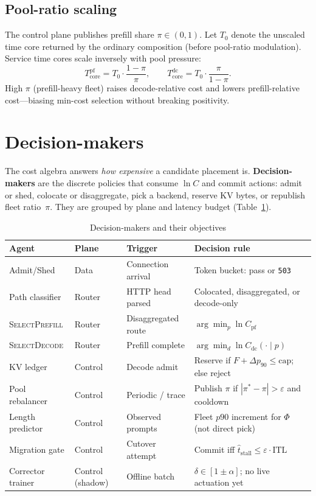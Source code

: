 \documentclass[11pt,a4paper]{article}
\begin{document}
\subsection{Pool-ratio scaling}

The control plane publishes prefill share $\pi \in (0,1)$.
Let $T_0$ denote the unscaled time core returned by the ordinary composition
(before pool-ratio modulation).
Service time cores scale inversely with pool pressure:
\begin{equation}
  T_{\mathrm{core}}^{\mathrm{pf}} = T_0 \cdot \frac{1-\pi}{\pi},
  \qquad
  T_{\mathrm{core}}^{\mathrm{dc}} = T_0 \cdot \frac{\pi}{1-\pi}.
\end{equation}
High $\pi$ (prefill-heavy fleet) raises decode-relative cost and lowers
prefill-relative cost---biasing min-cost selection without breaking
positivity.

\section{Decision-makers}

The cost algebra answers \emph{how expensive} a candidate placement is.
\textbf{Decision-makers} are the discrete policies that consume $\ln C$ and
commit actions: admit or shed, colocate or disaggregate, pick a backend,
reserve KV bytes, or republish fleet ratio~$\pi$.
They are grouped by plane and latency budget (Table~\ref{tab:deciders}).

\begin{table}[t]
  \centering
  \caption{Decision-makers and their objectives}
  \label{tab:deciders}
  \small
  \begin{tabular}{@{}p{2.1cm}p{2.4cm}p{2.6cm}p{4.8cm}@{}}
    \toprule
    Agent & Plane & Trigger & Decision rule \\
    \midrule
    Admit/Shed & Data & Connection arrival & Token bucket: pass or \texttt{503} \\
    Path classifier & Router & HTTP head parsed & Colocated, disaggregated, or decode-only \\
    \textsc{SelectPrefill} & Router & Disaggregated route & $\arg\min_p \ln C_{\mathrm{pf}}$ \\
    \textsc{SelectDecode} & Router & Prefill complete & $\arg\min_d \ln C_{\mathrm{dc}}(\cdot \mid p)$ \\
    KV ledger & Control & Decode admit & Reserve if $F + \Delta p_{90} \le \text{cap}$; else reject \\
    Pool rebalancer & Control & Periodic / trace & Publish $\pi$ if $|\pi^* - \pi| > \varepsilon$ and cooldown \\
    Length predictor & Control & Observed prompts & Fleet $p90$ increment for $\Phi$ (not direct pick) \\
    Migration gate & Control & Cutover attempt & Commit iff $\widehat{t}_{\mathrm{stall}} \le \varepsilon \cdot \mathrm{ITL}$ \\
    Corrector trainer & Control (shadow) & Offline batch & $\delta \in [1\!\pm\!\alpha]$; no live actuation yet \\
    \bottomrule
  \end{tabular}
\end{table}
\end{document}
